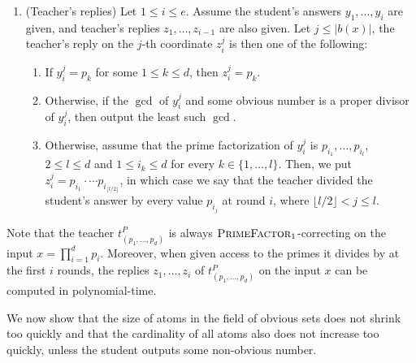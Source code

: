 \documentclass{lmcs}
\newcommand{\abs}[1]{\lvert #1\rvert}
\newcommand{\floor}[1]{\lfloor #1\rfloor}
\newcommand{\PrimeFactor}{\textsc{PrimeFactor}}
\begin{document}
\begin{defi}
\begin{enumerate}
        \item (Teacher's replies) Let $1\leq i\leq {e}$. Assume the student's answers $y_1,\dots,y_{i}$ are given, and teacher's replies $z_1,\dots,z_{i-1}$ are also given. Let $j\leq \abs{b(x)}$, the teacher's reply on the $j$-th coordinate $z_i^j$ is then one of the following:
        \begin{enumerate}
            \item If $y_i^j = p_k$ for some $1\leq k \leq d$, then $z_i^j=p_k$.
            \item Otherwise, if the $\gcd$ of $y_i^j$ and some obvious number is a proper divisor of $y_i^j$, then output the least such $\gcd$.
            \item Otherwise, assume that the prime factorization of $y_i^j$ is $p_{i_1},\dots,p_{i_{l}}$, $2\leq l\leq d$ and $1\leq i_k\leq d$ for every $k\in \{1,\dots,l\}$. Then, we put $z_i^j=p_{i_1}\cdot \cdots p_{i_{\floor{l/2}}}$, in which case we say that the teacher divided the student's answer by every value $p_{i_j}$ at round $i$, where $\floor{l/2} < j\leq l$.
        \end{enumerate}
    \end{enumerate}
\end{defi}

Note that the teacher $t^P_{(p_1,\dots,p_d)}$ is always $\PrimeFactor_1$-correcting on the input $x=\prod_{i=1}^d p_i$. Moreover, when given access to the primes it divides by at the first $i$ rounds, the replies $z_1,\dots,z_i$ of $t_{(p_1,\dots,p_d)}^P$ on the input $x$ can be computed in polynomial-time. 

We now show that the size of atoms in the field of obvious sets does not shrink too quickly and that the cardinality of all atoms also does not increase too quickly, unless the student outputs some non-obvious number.
\end{document}
